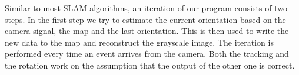 Similar to most SLAM algorithms, an iteration of our program consists of two steps. In the first step we try to estimate the current orientation based on the camera signal, the map and the last orientation. This is then used to write the new data to the map and reconstruct the grayscale image. The iteration is performed every time an event arrives from the camera. Both the tracking and the rotation work on the assumption that the output  of the other one is correct.